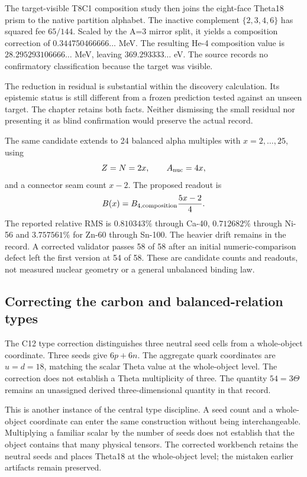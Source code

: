 The target-visible T8C1 composition study then joins the eight-face Theta18 prism to the native partition alphabet. The inactive complement $\{2,3,4,6\}$ has squared fee $65/144$. Scaled by the A=3 mirror split, it yields a composition correction of $0.344750466666\ldots$ MeV. The resulting He-4 composition value is $28.295293106666\ldots$ MeV, leaving $369.293333\ldots$ eV. The source records no confirmatory classification because the target was visible.

The reduction in residual is substantial within the discovery calculation. Its epistemic status is still different from a frozen prediction tested against an unseen target. The chapter retains both facts. Neither dismissing the small residual nor presenting it as blind confirmation would preserve the actual record.

The same candidate extends to 24 balanced alpha multiples with $x=2,\ldots,25$, using
\begin{equation}
Z=N=2x,\qquad A_{\rm nuc}=4x,
\end{equation}
and a connector seam count $x-2$. The proposed readout is
\begin{equation}
B(x)=B_{4,\rm composition}\frac{5x-2}{4}.
\end{equation}
The reported relative RMS is $0.810343\%$ through Ca-40, $0.712682\%$ through Ni-56 and $3.757561\%$ for Zn-60 through Sn-100. The heavier drift remains in the record. A corrected validator passes 58 of 58 after an initial numeric-comparison defect left the first version at 54 of 58. These are candidate counts and readouts, not measured nuclear geometry or a general unbalanced binding law.

\subsection{Correcting the carbon and balanced-relation types}

The C12 type correction distinguishes three neutral seed cells from a whole-object coordinate. Three seeds give $6p+6n$. The aggregate quark coordinates are $u=d=18$, matching the scalar Theta value at the whole-object level. The correction does not establish a Theta multiplicity of three. The quantity $54=3\Theta$ remains an unassigned derived three-dimensional quantity in that record.

This is another instance of the central type discipline. A seed count and a whole-object coordinate can enter the same construction without being interchangeable. Multiplying a familiar scalar by the number of seeds does not establish that the object contains that many physical tensors. The corrected workbench retains the neutral seeds and places Theta18 at the whole-object level; the mistaken earlier artifacts remain preserved.

